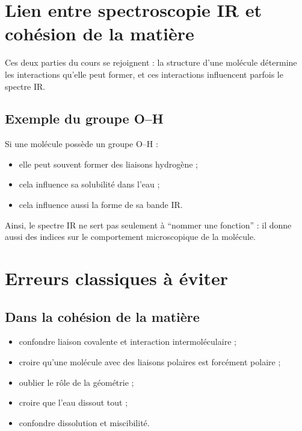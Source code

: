 \documentclass[11pt,a4paper]{article}
\begin{document}
\section{Lien entre spectroscopie IR et cohésion de la matière}

\begin{ideebox}
Ces deux parties du cours se rejoignent :  
la structure d’une molécule détermine les interactions qu’elle peut former, et ces interactions influencent parfois le spectre IR.
\end{ideebox}

\subsection{Exemple du groupe O--H}

Si une molécule possède un groupe O--H :
\begin{itemize}
    \item elle peut souvent former des liaisons hydrogène ;
    \item cela influence sa solubilité dans l’eau ;
    \item cela influence aussi la forme de sa bande IR.
\end{itemize}

\begin{comprendrebox}
Ainsi, le spectre IR ne sert pas seulement à ``nommer une fonction'' : il donne aussi des indices sur le comportement microscopique de la molécule.
\end{comprendrebox}

\section{Erreurs classiques à éviter}

\subsection{Dans la cohésion de la matière}

\begin{itemize}
    \item confondre liaison covalente et interaction intermoléculaire ;
    \item croire qu’une molécule avec des liaisons polaires est forcément polaire ;
    \item oublier le rôle de la géométrie ;
    \item croire que l’eau dissout tout ;
    \item confondre dissolution et miscibilité.
\end{itemize}
\end{document}
